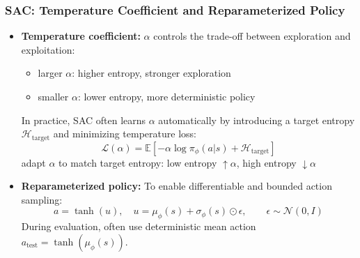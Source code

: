 \documentclass[11pt,aspectratio=169,xcolor={dvipsnames},usepdftitle=false]{beamer}
\begin{document}
\begin{frame}
\frametitle{SAC: Temperature Coefficient and Reparameterized Policy}
\begin{itemize}

	\item \textbf{Temperature coefficient:} $\alpha$ controls the trade-off between exploration and exploitation:
	\begin{itemize}
		\item larger $\alpha$: higher entropy, stronger exploration
		\item smaller $\alpha$: lower entropy, more deterministic policy
	\end{itemize}
	In practice, SAC often learns $\alpha$ automatically by introducing a target entropy $\mathcal{H}_\text{target}$ and minimizing temperature loss:
    \vspace{-1.5em}
    $$
    \mathcal{L}(\alpha) = \mathbb{E}\left[-\alpha\log\pi_\phi(a|s) + \mathcal{H}_\text{target}\right]
    $$
	adapt $\alpha$ to match target entropy: low entropy $\uparrow \alpha$, high entropy $\downarrow \alpha$
	
	\item \textbf{Reparameterized policy:}
	To enable differentiable and bounded action sampling:
	\vspace{-1.0em}
    $$
	a = \tanh(u), \quad u = \mu_\phi(s) + \sigma_\phi(s)\odot \epsilon,\qquad \epsilon \sim \mathcal{N}(0,I)
	$$
    During evaluation, often use deterministic mean action $a_{\text{test}} = \tanh(\mu_\phi(s))$.

\end{itemize}
\end{frame}
\end{document}
